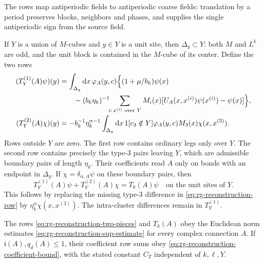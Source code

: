 The rows map antiperiodic fields to antiperiodic coarse fields:
translation by a period preserves blocks, neighbors and phases,
and supplies the single antiperiodic sign from the source field.

If $Y$ is a union of $M$-cubes and $y\in Y$ is a unit site,
then $\Delta_y\subset Y$: both $M$ and $L^k$ are odd, and the
unit block is contained in the $M$-cube of its center.
Define the two rows
\begin{equation}\label{eq:rg-reconstruction-two-pieces}
 \begin{split}
 (T_Y^{(1)}(A)\psi)(y)
 &=\int_{\Delta_y}\mathrm d x\,\varphi_A(y,c)
    \Bigl\{(1+\mu/b_k)\psi(x)\\
 &\qquad-(b_k\eta_k)^{-1}\!\!\sum_{i:\,x^{(i)}\text{ over }Y}
           M_i(x)[U_A(x,x^{(i)})\psi(x^{(i)})-\psi(x)]\Bigr\},\\
 (T_Y^{(2)}(A)\chi)(y)
 &=-b_k^{-1}\eta_k^{\alpha-1}\int_{\Delta_y}\mathrm d x\,
                1[c_3\notin Y]\varphi_A(y,c)M_3(x)\chi(x,x^{(3)}).
 \end{split}
\end{equation}
Rows outside $Y$ are zero. The first row contains ordinary
legs only over $Y$. The second row contains precisely the
type-$3$ pairs leaving $Y$, which are admissible boundary
pairs of length $\eta_k$. Their coefficients read $A$ only
on bonds with an endpoint in $\Delta_y$.
If $\chi=\delta_{\alpha,A}\psi$ on these boundary pairs, then
\begin{equation}\label{eq:rg-reconstruction-local-identity}
 T_Y^{(1)}(A)\psi+T_Y^{(2)}(A)\chi=T_k(A)\psi
                                             \quad\text{on the unit sites of }Y.
\end{equation}
This follows by replacing the missing type-$3$ difference in
\eqref{eq:rg-reconstruction-row} by
$\eta_k^\alpha\chi(x,x^{(3)})$.
The intra-cluster differences remain in $T_Y^{(1)}$.

\begin{proposition}\label{prop:rg-reconstruction-estimate}
The rows \eqref{eq:rg-reconstruction-two-pieces} and $T_k(A)$
obey the Euclidean norm estimates
\eqref{eq:rg-reconstruction-sup-estimate} for every complex
connection $A$. If $\mathfrak i(A),q_d(A)\le1$, their coefficient
row sums obey \eqref{eq:rg-reconstruction-coefficient-bound},
with the stated constant $C_T$ independent of $k,\ell,Y$.
\end{proposition}

